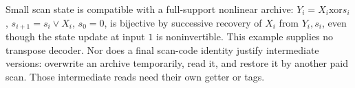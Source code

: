 Small scan state is compatible with a full-support nonlinear archive:
$Y_i=X_i\mathbin{\mathrm{xor}}s_i$, $s_{i+1}=s_i\lor X_i$, $s_0=0$,
is bijective by successive recovery of $X_i$ from $Y_i,s_i$, even though
the state update at input $1$ is noninvertible. This example supplies no
transpose decoder. Nor does a final scan-code identity justify intermediate
versions: overwrite an archive temporarily, read it, and restore it by
another paid scan. Those intermediate reads need their own getter or tags.
